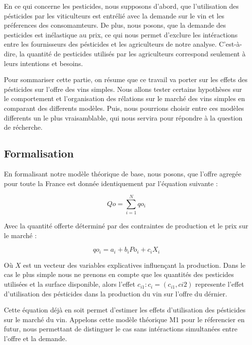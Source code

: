 \documentclass[11pt,]{article}
\begin{document}
En ce qui concerne les pesticides, nous supposons d'abord, que
l'utilisation des pésticides par les viticulteurs est entrélié avec la
demande sur le vin et les préferences des consomamteurs. De plus, nous
posons, que la demande des pesticides est inélastique au prix, ce qui
nous permet d'exclure les intéractions entre les fournisseurs des
pésticides et les agriculteurs de notre analyse. C'est-à-dire, la
quantité de pesticides utilisés par les agriculteurs correspond
seulement à leurs intentions et besoins.

Pour sommariser cette partie, on résume que ce travail va porter sur les
effets des pésticides sur l'offre des vins simples. Nous allons tester
certains hypothèses sur le comportement et l'organisation des rélations
sur le marché des vins simples en comparant des differents modèles.
Puis, nous pourrions choisir entre ces modèles differents un le plus
vraisamblable, qui nous servira pour répondre à la question de
récherche.

\hypertarget{formalisation}{%
\subsection{Formalisation}\label{formalisation}}

En formalisant notre modèle théorique de base, nous posons, que l'offre
agregée pour toute la France est donnée identiquement par l'équation
suivante :

\begin{equation}
    Qo = \sum_{i = 1}^{N} qo_i
\end{equation}

Avec la quantité offerte déterminé par des contraintes de production et
le prix sur le marché :

\begin{equation}
    qo_i = a_i + b_i Po_i + c_i X_i
\end{equation}

Où \(X\) est un vecteur des variables explicatives influençant la
production. Dans le cas le plus simple nous ne prenons en compte que les
quantités des pesticides utilisées et la surface disponible, alors
l'effet \(c_{i1} : c_i = (c_{i1}, c{i2})\) represente l'effet
d'utilisation des pésticides dans la production du vin sur l'offre du
dérnier.

Cette équation déjà en soit permet d'estimer les effets d'utilisation
des pésticides sur le marché du vin. Appelons cette modèle théorique M1
pour le réferencier en futur, nous permettant de distinguer le cas sans
intéractions simultanées entre l'offre et la demande.
\end{document}
